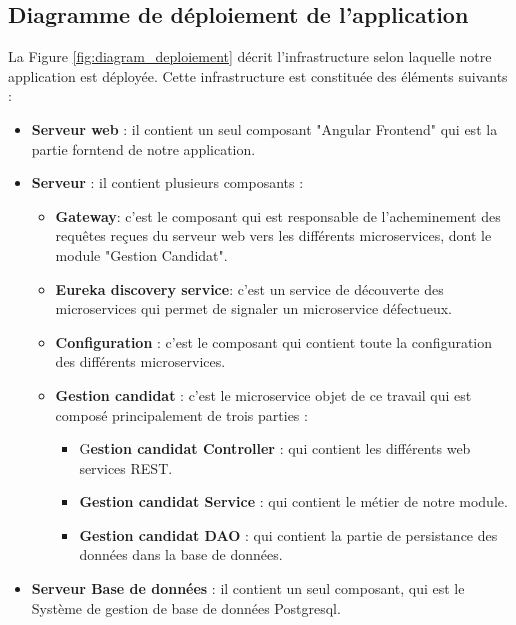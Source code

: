 \subsection{Diagramme de déploiement de l'application}
La Figure \ref{fig:diagram_deploiement} décrit l'infrastructure selon laquelle notre application est déployée. Cette infrastructure est constituée des éléments suivants :
\begin{itemize}
    \item \textbf{Serveur web} : il contient un seul composant "Angular Frontend" qui est la partie forntend de notre application.
    \item \textbf{Serveur} : il contient plusieurs composants : 
    \begin{itemize}
        \item \textbf{Gateway}: c'est le composant qui est responsable de l'acheminement des requêtes reçues du serveur web vers les différents microservices, dont le module "Gestion Candidat".
        \item \textbf{Eureka discovery service}: c'est un service de découverte des microservices qui permet de signaler un microservice défectueux.
        \item \textbf{Configuration} : c'est le composant qui contient toute la configuration des différents microservices.
        \item \textbf{Gestion candidat} : c'est le microservice objet de ce travail qui est composé principalement de trois parties : 
        \begin{itemize}
            \item G\textbf{estion candidat Controller} : qui contient les différents web services REST.
            \item \textbf{Gestion candidat Service} : qui contient le métier de notre module.
            \item \textbf{Gestion candidat DAO} : qui contient la partie de persistance des données dans la base de données.
        \end{itemize}
    \end{itemize}
    \item \textbf{Serveur Base de données} : il contient un seul composant, qui est le Système de gestion de base de données Postgresql.
\end{itemize}
